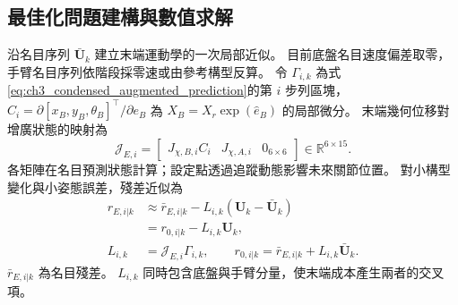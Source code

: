 \subsection{最佳化問題建構與數值求解}
\label{subsec:wholebody_qp_formulation}

沿名目序列 $\bar{\mathbf U}_k$ 建立末端運動學的一次局部近似。
目前底盤名目速度偏差取零，手臂名目序列依階段採零速或由參考構型反算。
令 $\Gamma_{i,k}$ 為式\eqref{eq:ch3_condensed_augmented_prediction}的第 $i$ 步列區塊，
$C_i=\partial[x_B,y_B,\theta_B]^\top/\partial e_B$
為 $X_B=X_r\exp(\widehat e_B)$ 的局部微分。
末端幾何位移對增廣狀態的映射為
\begin{equation}
    \mathcal J_{E,i}=
    \begin{bmatrix}
        J_{\chi,B,i}C_i&J_{\chi,A,i}&0_{6\times6}
    \end{bmatrix}\in\mathbb R^{6\times15}.
    \label{eq:ch3_tcp_augmented_geometric_jacobian}
\end{equation}
各矩陣在名目預測狀態計算；設定點透過追蹤動態影響未來關節位置。
對小構型變化與小姿態誤差，殘差近似為
\begin{equation}
    \begin{aligned}
        r_{E,i|k}
        &\approx\bar r_{E,i|k}
        -L_{i,k}(\mathbf U_k-\bar{\mathbf U}_k)\\
        &=r_{0,i|k}-L_{i,k}\mathbf U_k,\\
        L_{i,k}&=\mathcal J_{E,i}\Gamma_{i,k},\qquad
        r_{0,i|k}=\bar r_{E,i|k}+L_{i,k}\bar{\mathbf U}_k .
    \end{aligned}
    \label{eq:ch3_tcp_affine_residual}
\end{equation}
$\bar r_{E,i|k}$ 為名目殘差。
$L_{i,k}$ 同時包含底盤與手臂分量，使末端成本產生兩者的交叉項。

